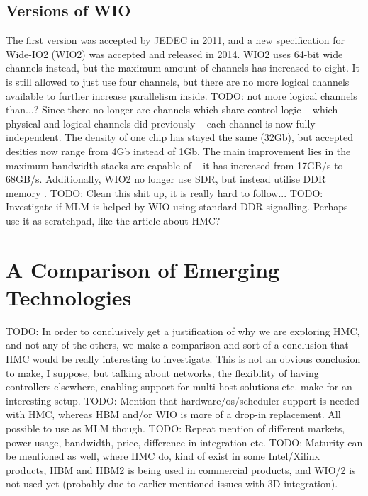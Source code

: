 \subsection{Versions of WIO}
The first version was accepted by JEDEC in 2011, and a new specification for Wide-IO2 (WIO2) was accepted and released in 2014. WIO2 uses 64-bit wide channels instead, but the maximum amount of channels has increased to eight. It is still allowed to just use four channels, but there are no more logical channels available to further increase parallelism inside. TODO: not more logical channels than...? Since there no longer are channels which share control logic -- which physical and logical channels did previously -- each channel is now fully independent. The density of one chip has stayed the same (32Gb), but accepted desities now range from 4Gb instead of 1Gb. The main improvement lies in the maximum bandwidth stacks are capable of -- it has increased from 17GB/s to 68GB/s. Additionally, WIO2 no longer use SDR, but instead utilise DDR memory \cite{standard2014wide}. TODO: Clean this shit up, it is really hard to follow...
TODO: Investigate if MLM is helped by WIO using standard DDR signalling. Perhaps use it as scratchpad, like the article about HMC? 

\section{A Comparison of Emerging Technologies}
TODO: In order to conclusively get a justification of why we are exploring HMC, and not any of the others, we make a comparison and sort of a conclusion that HMC would be really interesting to investigate. This is not an obvious conclusion to make, I suppose, but talking about networks, the flexibility of having controllers elsewhere, enabling support for multi-host solutions etc. make for an interesting setup. 
TODO: Mention that hardware/os/scheduler support is needed with HMC, whereas HBM and/or WIO is more of a drop-in replacement. All possible to use as MLM though.
TODO: Repeat mention of different markets, power usage, bandwidth, price, difference in integration etc. 
TODO: Maturity can be mentioned as well, where HMC do, kind of exist in some Intel/Xilinx products, HBM and HBM2 is being used in commercial products, and WIO/2 is not used yet (probably due to earlier mentioned issues with 3D integration).